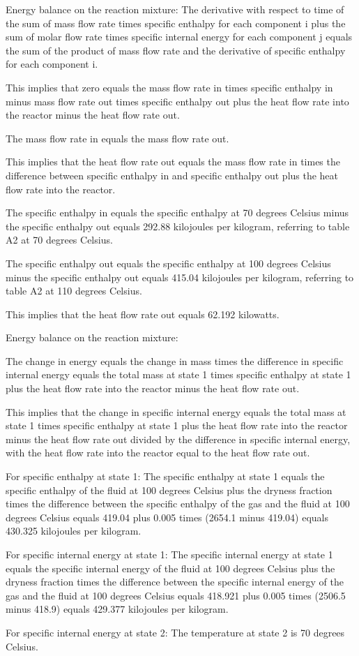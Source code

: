 Energy balance on the reaction mixture:
The derivative with respect to time of the sum of mass flow rate times specific enthalpy for each component i plus the sum of molar flow rate times specific internal energy for each component j equals the sum of the product of mass flow rate and the derivative of specific enthalpy for each component i.

This implies that zero equals the mass flow rate in times specific enthalpy in minus mass flow rate out times specific enthalpy out plus the heat flow rate into the reactor minus the heat flow rate out.

The mass flow rate in equals the mass flow rate out.

This implies that the heat flow rate out equals the mass flow rate in times the difference between specific enthalpy in and specific enthalpy out plus the heat flow rate into the reactor.

The specific enthalpy in equals the specific enthalpy at 70 degrees Celsius minus the specific enthalpy out equals 292.88 kilojoules per kilogram, referring to table A2 at 70 degrees Celsius.

The specific enthalpy out equals the specific enthalpy at 100 degrees Celsius minus the specific enthalpy out equals 415.04 kilojoules per kilogram, referring to table A2 at 110 degrees Celsius.

This implies that the heat flow rate out equals 62.192 kilowatts.

Energy balance on the reaction mixture:

The change in energy equals the change in mass times the difference in specific internal energy equals the total mass at state 1 times specific enthalpy at state 1 plus the heat flow rate into the reactor minus the heat flow rate out.

This implies that the change in specific internal energy equals the total mass at state 1 times specific enthalpy at state 1 plus the heat flow rate into the reactor minus the heat flow rate out divided by the difference in specific internal energy, with the heat flow rate into the reactor equal to the heat flow rate out.

For specific enthalpy at state 1:
The specific enthalpy at state 1 equals the specific enthalpy of the fluid at 100 degrees Celsius plus the dryness fraction times the difference between the specific enthalpy of the gas and the fluid at 100 degrees Celsius equals 419.04 plus 0.005 times (2654.1 minus 419.04) equals 430.325 kilojoules per kilogram.

For specific internal energy at state 1:
The specific internal energy at state 1 equals the specific internal energy of the fluid at 100 degrees Celsius plus the dryness fraction times the difference between the specific internal energy of the gas and the fluid at 100 degrees Celsius equals 418.921 plus 0.005 times (2506.5 minus 418.9) equals 429.377 kilojoules per kilogram.

For specific internal energy at state 2:
The temperature at state 2 is 70 degrees Celsius.